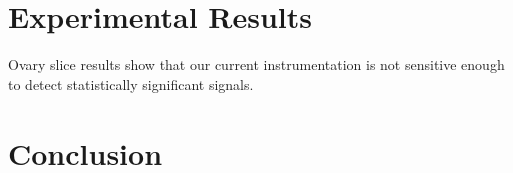 \documentclass[twocolumn]{article}
\begin{document}
\section{Experimental Results}

Ovary slice results show that our current instrumentation is not sensitive enough to detect statistically significant signals.

\section{Conclusion}

\end{document}
